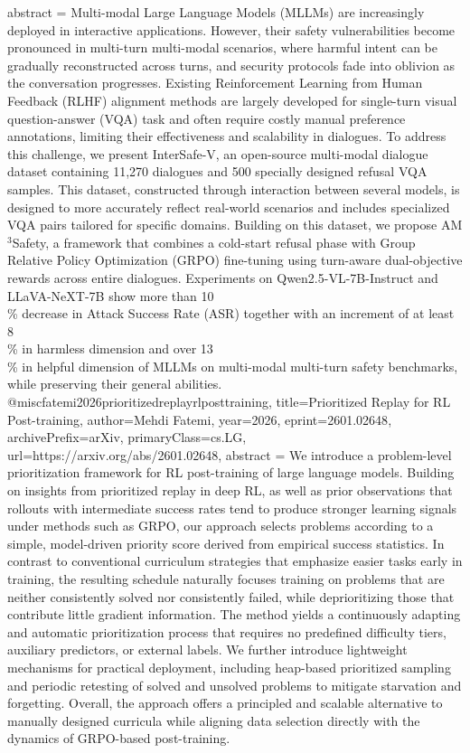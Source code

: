 {      abstract = {Multi-modal Large Language Models (MLLMs) are increasingly deployed in interactive applications. However, their safety vulnerabilities become pronounced in multi-turn multi-modal scenarios, where harmful intent can be gradually reconstructed across turns, and security protocols fade into oblivion as the conversation progresses. Existing Reinforcement Learning from Human Feedback (RLHF) alignment methods are largely developed for single-turn visual question-answer (VQA) task and often require costly manual preference annotations, limiting their effectiveness and scalability in dialogues. To address this challenge, we present InterSafe-V, an open-source multi-modal dialogue dataset containing 11,270 dialogues and 500 specially designed refusal VQA samples. This dataset, constructed through interaction between several models, is designed to more accurately reflect real-world scenarios and includes specialized VQA pairs tailored for specific domains. Building on this dataset, we propose AM$^3$Safety, a framework that combines a cold-start refusal phase with Group Relative Policy Optimization (GRPO) fine-tuning using turn-aware dual-objective rewards across entire dialogues. Experiments on Qwen2.5-VL-7B-Instruct and LLaVA-NeXT-7B show more than 10\\\% decrease in Attack Success Rate (ASR) together with an increment of at least 8\\\% in harmless dimension and over 13\\\% in helpful dimension of MLLMs on multi-modal multi-turn safety benchmarks, while preserving their general abilities.}
}@misc{fatemi2026prioritizedreplayrlposttraining,
      title={Prioritized Replay for RL Post-training}, 
      author={Mehdi Fatemi},
      year={2026},
      eprint={2601.02648},
      archivePrefix={arXiv},
      primaryClass={cs.LG},
      url={https://arxiv.org/abs/2601.02648},
      abstract = {We introduce a problem-level prioritization framework for RL post-training of large language models. Building on insights from prioritized replay in deep RL, as well as prior observations that rollouts with intermediate success rates tend to produce stronger learning signals under methods such as GRPO, our approach selects problems according to a simple, model-driven priority score derived from empirical success statistics. In contrast to conventional curriculum strategies that emphasize easier tasks early in training, the resulting schedule naturally focuses training on problems that are neither consistently solved nor consistently failed, while deprioritizing those that contribute little gradient information. The method yields a continuously adapting and automatic prioritization process that requires no predefined difficulty tiers, auxiliary predictors, or external labels. We further introduce lightweight mechanisms for practical deployment, including heap-based prioritized sampling and periodic retesting of solved and unsolved problems to mitigate starvation and forgetting. Overall, the approach offers a principled and scalable alternative to manually designed curricula while aligning data selection directly with the dynamics of GRPO-based post-training.}
}
